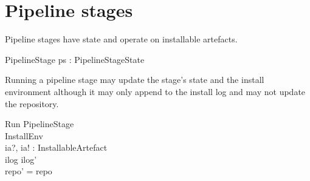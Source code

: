 \documentclass[a4paper,twoside,12pt]{article}
\begin{document}
\clearpage
\section{Pipeline stages}

Pipeline stages have state and operate on installable artefacts.
\begin{zed}
\end{zed}

\begin{schema}{PipelineStage}
 ps : PipelineStageState \\
\end{schema}

Running a pipeline stage may update the stage's state and the install environment although it may
only append to the install log and may not update the repository.
\begin{schema}{Run}
 \Delta PipelineStage \\
 \Delta InstallEnv \\
 ia?, ia! : InstallableArtefact \\
\where
 ilog \subseteq ilog' \\
 repo' = repo \\
\end{schema}
\end{document}
